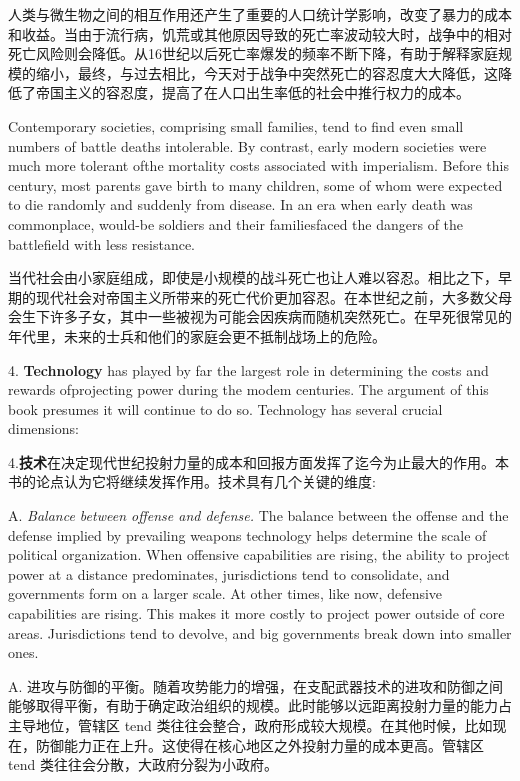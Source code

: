 \begin{Parallel}{97mm}{45mm}
  \ParallelRText
  {人类与微生物之间的相互作用还产生了重要的人口统计学影响，改变了暴力的成本和收益。当由于流行病，饥荒或其他原因导致的死亡率波动较大时，战争中的相对死亡风险则会降低。从16世纪以后死亡率爆发的频率不断下降，有助于解释家庭规模的缩小，最终，与过去相比，今天对于战争中突然死亡的容忍度大大降低，这降低了帝国主义的容忍度，提高了在人口出生率低的社会中推行权力的成本。}
  \ParallelPar


  \ParallelLText
  {Contemporary societies, comprising small families, tend to find even small numbers of battle deaths intolerable. By contrast, early modern societies were much more tolerant ofthe mortality costs associated with imperialism. Before this century, most parents gave birth to many children, some of whom were expected to die randomly and suddenly from disease. In an era when early death was commonplace, would-be soldiers and their familiesfaced the dangers of the battlefield with less resistance.}
  
  \ParallelRText
  {当代社会由小家庭组成，即使是小规模的战斗死亡也让人难以容忍。相比之下，早期的现代社会对帝国主义所带来的死亡代价更加容忍。在本世纪之前，大多数父母会生下许多子女，其中一些被视为可能会因疾病而随机突然死亡。在早死很常见的年代里，未来的士兵和他们的家庭会更不抵制战场上的危险。
  }
  \ParallelPar


  \ParallelLText
  {4. \textbf{Technology} has played by far the largest role in determining the costs and rewards ofprojecting power during the modem centuries. The argument of this book presumes it will continue to do so. Technology has several crucial dimensions: }
  
  \ParallelRText
  {4.\textbf{技术}在决定现代世纪投射力量的成本和回报方面发挥了迄今为止最大的作用。本书的论点认为它将继续发挥作用。技术具有几个关键的维度:}
  \ParallelPar



  \ParallelLText
  {A. \emph{Balance between offense and defense.} The balance between the offense and the defense implied by prevailing weapons technology helps determine the scale of political organization. When offensive capabilities are rising, the ability to project power at a distance predominates, jurisdictions tend to consolidate, and governments form on a larger scale. At other times, like now, defensive capabilities are rising. This makes it more costly to project power outside of core areas. Jurisdictions tend to devolve, and big governments break down into smaller ones. }
  
  \ParallelRText
  {A. 进攻与防御的平衡。随着攻势能力的增强，在支配武器技术的进攻和防御之间能够取得平衡，有助于确定政治组织的规模。此时能够以远距离投射力量的能力占主导地位，管辖区 tend 类往往会整合，政府形成较大规模。在其他时候，比如现在，防御能力正在上升。这使得在核心地区之外投射力量的成本更高。管辖区 tend 类往往会分散，大政府分裂为小政府。}
  \ParallelPar



\end{Parallel}
